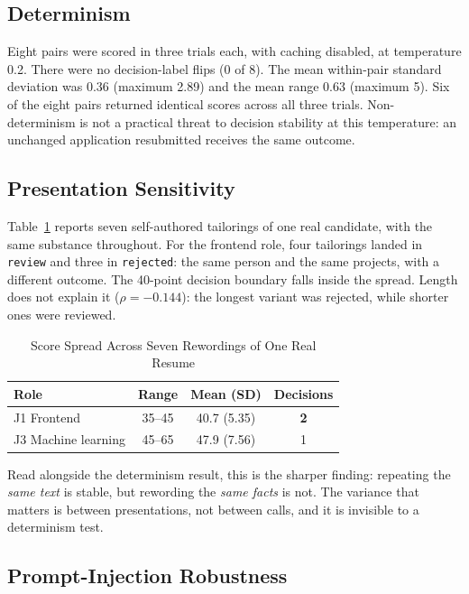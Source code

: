 \documentclass[conference]{IEEEtran}
\begin{document}
\subsection{Determinism}

Eight pairs were scored in three trials each, with caching disabled, at
temperature 0.2. There were no decision-label flips (0 of 8). The mean
within-pair standard deviation was 0.36 (maximum 2.89) and the mean range 0.63
(maximum 5). Six of the eight pairs returned identical scores across all three
trials. Non-determinism is not a practical threat to decision stability at this
temperature: an unchanged application resubmitted receives the same outcome.

\subsection{Presentation Sensitivity}

Table~\ref{tab:variants} reports seven self-authored tailorings of one real
candidate, with the same substance throughout. For the frontend role, four
tailorings landed in \texttt{review} and three in \texttt{rejected}: the same
person and the same projects, with a different outcome. The 40-point decision
boundary falls inside the spread. Length does not explain it ($\rho = -0.144$):
the longest variant was rejected, while shorter ones were reviewed.

\begin{table}[!t]
\caption{Score Spread Across Seven Rewordings of One Real Resume}
\label{tab:variants}
\begin{center}
\begin{tabular}{|l|c|c|c|}
\hline
\textbf{Role} & \textbf{Range} & \textbf{Mean (SD)} & \textbf{Decisions} \\
\hline
J1 Frontend & 35--45 & 40.7 (5.35) & \textbf{2} \\
\hline
J3 Machine learning & 45--65 & 47.9 (7.56) & 1 \\
\hline
\end{tabular}
\end{center}
\end{table}

Read alongside the determinism result, this is the sharper finding: repeating
the \textit{same text} is stable, but rewording the \textit{same facts} is not.
The variance that matters is between presentations, not between calls, and it
is invisible to a determinism test.

\subsection{Prompt-Injection Robustness}
\label{sec:injection}
\end{document}
